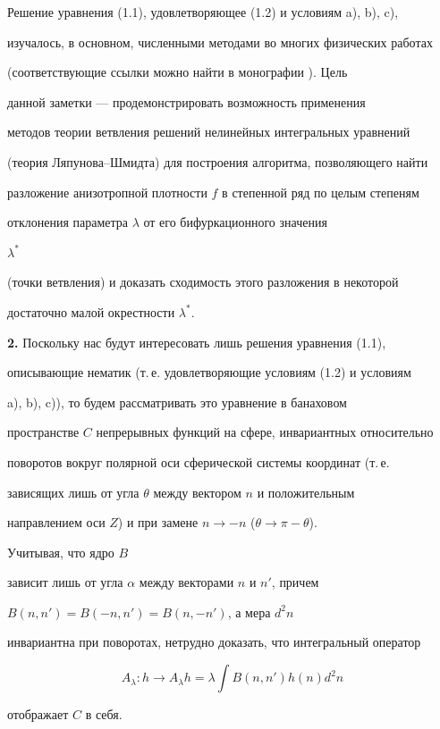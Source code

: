 Решение уравнения (1.1), удовлетворяющее (1.2) и условиям a), b), c),


изучалось, в основном, численными методами во многих физических работах


(соответствующие ссылки можно найти в монографии \cite{1}). Цель


данной заметки --- продемонстрировать возможность применения


методов теории ветвления решений нелинейных интегральных уравнений


(теория Ляпунова--Шмидта) для построения алгоритма, позволяющего найти


разложение анизотропной плотности $f$ в степенной ряд по целым степеням


отклонения параметра $\lambda$ от его бифуркационного значения


$\lambda^*$


(точки ветвления) и доказать сходимость этого разложения в некоторой


достаточно малой окрестности $\lambda^*$.


\medskip





{\bf 2.} Поскольку нас будут интересовать лишь решения уравнения (1.1),


описывающие нематик (т.\,е. удовлетворяющие условиям (1.2) и условиям


a), b), c)), то будем рассматривать это уравнение в банаховом


пространстве $C$ непрерывных функций на сфере, инвариантных относительно


поворотов вокруг полярной оси сферической системы координат (т.\,е.


зависящих лишь от угла $\theta$ между вектором $n$ и положительным


направлением оси $Z$) и при замене $n\to-n$ ($\theta\to\pi-\theta$).


Учитывая, что ядро $B$


зависит лишь от угла $\alpha$ между векторами $n$ и $n'$, причем


$B(n,n')=B(-n,n')=B(n,-n')$, а мера $d^2n$


инвариантна при поворотах, нетрудно доказать, что интегральный оператор


$$


A_\lambda:h\to A_\lambda h=\lambda\int B(n,n')h(n)d^2n


$$


отображает $C$ в себя.






